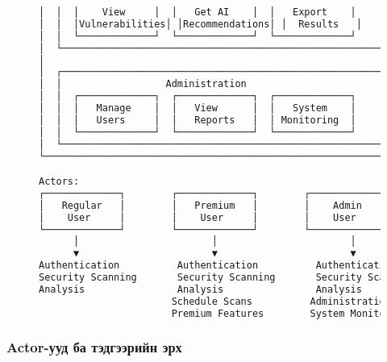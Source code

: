 \documentclass[main.tex]{subfiles}
\begin{document}
\begin{figure}[h]
\begin{lstlisting}[language=bash, caption=WebSecPen Use Case диаграм]
│  │  │    View     │  │   Get AI    │  │   Export    │     │    │
│  │  │Vulnerabilities│ │Recommendations│ │  Results   │     │    │
│  │  └─────────────┘  └─────────────┘  └─────────────┘     │    │
│  └─────────────────────────────────────────────────────────┘    │
│                                                                 │
│  ┌─────────────────────────────────────────────────────────┐    │
│  │                  Administration                         │    │
│  │  ┌─────────────┐  ┌─────────────┐  ┌─────────────┐     │    │
│  │  │   Manage    │  │   View      │  │   System    │     │    │
│  │  │   Users     │  │   Reports   │  │ Monitoring  │     │    │
│  │  └─────────────┘  └─────────────┘  └─────────────┘     │    │
│  └─────────────────────────────────────────────────────────┘    │
└─────────────────────────────────────────────────────────────────┘

Actors:
┌─────────────┐        ┌─────────────┐        ┌─────────────┐
│   Regular   │        │   Premium   │        │    Admin    │
│    User     │        │    User     │        │    User     │
└─────────────┘        └─────────────┘        └─────────────┘
      │                       │                       │
      ▼                       ▼                       ▼
Authentication          Authentication          Authentication
Security Scanning       Security Scanning       Security Scanning
Analysis                Analysis                Analysis
                       Schedule Scans          Administration
                       Premium Features        System Monitoring
\end{lstlisting}
\end{figure}

\subsubsection{Actor-ууд ба тэдгээрийн эрх}
\end{document}

